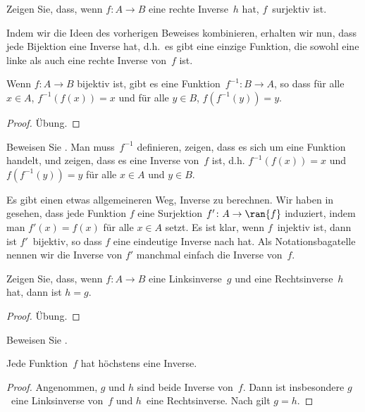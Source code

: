 \documentclass[../../../include/open-logic-section]{subfiles}
\begin{document}
\begin{prob}
Zeigen Sie, dass, wenn $f\colon A \to B$ eine rechte Inverse~$h$ hat, $f$~surjektiv ist.
\end{prob}

\begin{explain}
  Indem wir die Ideen des vorherigen Beweises kombinieren, erhalten wir nun, dass jede
  Bijektion eine Inverse hat, d.h.\ es gibt eine einzige Funktion,
  die sowohl eine linke als auch eine rechte Inverse von~$f$ ist.
\end{explain}

\begin{prop}
Wenn $f\colon A \to B$ bijektiv ist, gibt es eine
Funktion~$f^{-1}\colon B \to A$, so dass für alle $x \in A$,
$f^{-1}(f(x)) = x$ und für alle $y \in B$, $f(f^{-1}(y)) = y$.
\end{prop}

\begin{proof}
Übung.
\end{proof}

\begin{prob}
Beweisen Sie . Man muss~$f^{-1}$ definieren,
zeigen, dass es sich um eine Funktion handelt, und zeigen, dass es eine
Inverse von~$f$ ist, d.h. $f^{-1}(f(x)) = x$ und $f(f^{-1}(y)) = y$ für
alle $x \in A$ und $y \in B$.
\end{prob}

\begin{explain}
Es gibt einen etwas allgemeineren Weg, Inverse zu berechnen. Wir haben in
 gesehen, dass jede Funktion $f$ eine Surjektion $f'
\colon A \to \ran{f}$ induziert, indem man $f'(x) = f(x)$ für alle $x \in A$ setzt.
Es ist klar, wenn $f$~injektiv ist, dann ist $f'$~bijektiv, so dass
$f$ eine eindeutige Inverse nach  hat.
Als Notationsbagatelle nennen wir die Inverse von $f'$ manchmal einfach
\glqq die Inverse von~$f$.\grqq{}
\end{explain}

\begin{prop}%
  Zeigen Sie, dass, wenn $f\colon A \to B$ eine Linksinverse~$g$ und eine Rechtsinverse~$h$ hat,
  dann ist $h = g$.
\end{prop}

\begin{proof}
  Übung.
\end{proof}

\begin{prob}
  Beweisen Sie .
\end{prob}

\begin{prop}
Jede Funktion~$f$ hat höchstens eine Inverse.
\end{prop}

\begin{proof}
  Angenommen, $g$ und $h$ sind beide Inverse von~$f$. Dann ist insbesondere
  $g$~eine Linksinverse von~$f$ und $h$~eine Rechtsinverse. Nach
   gilt $g = h$.
\end{proof}
\end{document}
